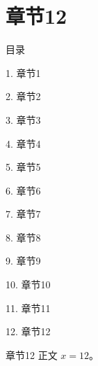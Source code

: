 \documentclass[aspectratio=169,10pt,fontset=fandol]{ctexbeamer}
\begin{document}
\section{章节12}
\begin{frame}[t,fragile]{目录}
\small
{\color{black}\small 1. 章节1\par}\vspace{0.22em}
{\color{black}\small 2. 章节2\par}\vspace{0.22em}
{\color{black}\small 3. 章节3\par}\vspace{0.22em}
{\color{black}\small 4. 章节4\par}\vspace{0.22em}
{\color{black}\small 5. 章节5\par}\vspace{0.22em}
{\color{black}\small 6. 章节6\par}\vspace{0.22em}
{\color{black}\small 7. 章节7\par}\vspace{0.22em}
{\color{black}\small 8. 章节8\par}\vspace{0.22em}
{\color{black}\small 9. 章节9\par}\vspace{0.22em}
{\color{black}\small 10. 章节10\par}\vspace{0.22em}
{\color{black}\small 11. 章节11\par}\vspace{0.22em}
{\color{blue}\small 12. 章节12\par}\vspace{0.22em}
\end{frame}
\begin{frame}[t,fragile]{章节12}
\normalsize
{\normalsize
正文 $x=12$。
}
\end{frame}
\end{document}
